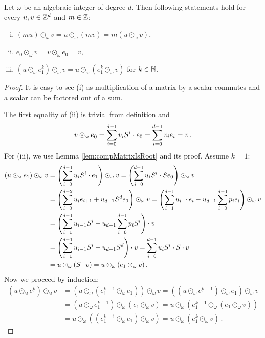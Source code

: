 \begin{lem}
\label{lem:multInZd}
Let $\omega$ be an algebraic integer of degree $d$. Then following statements hold for every $u,v\in \mathbb{Z}^d$ and $m\in\mathbb{Z}$:
\begin{enumerate}[(i)]
    \item $(mu)\odot_\omega v = u \odot_\omega (m v)= m (u\odot_\omega v)$,
    \item $e_0 \odot_\omega v= v \odot_\omega e_0 =v$,
    \item $(u \odot_\omega e_1^k)\odot_\omega v = u \odot_\omega (e_1^k\odot_\omega v)$ for $k\in\mathbb{N}$.
\end{enumerate}
\end{lem}
\begin{proof}
It is easy to see (i) as multiplication of a matrix by a scalar commutes and a scalar can be factored out of a sum. 

The first equality of (ii) is trivial from definition and
$$
v \odot_\omega e_0=\sum_{i=0}^{d-1} {v}_i S^i\cdot e_0= \sum_{i=0}^{d-1} v_i e_i = v\,.
$$
For (iii), we use Lemma \ref{lem:compMatrixIsRoot} and its proof. Assume $k=1$:
\begin{align*}
(u \odot_\omega e_1)\odot_\omega v &= \left(\sum_{i=0}^{d-1} {u}_i S^i \cdot e_1\right) \odot_\omega v = \left(\sum_{i=0}^{d-1} {u}_i S^i \cdot S e_0\right) \odot_\omega v \\
    &=\left(\sum_{i=0}^{d-2}u_i e_{i+1} + u_{d-1} S^d e_{0} \right)\odot_\omega v= \left(\sum_{i=1}^{d-1}u_{i-1} e_{i} - u_{d-1} \sum_{i=0}^{d-1} p_i e_{i} \right)\odot_\omega v \\
    &=\left(\sum_{i=1}^{d-1}u_{i-1}S^i - u_{d-1} \sum_{i=0}^{d-1}p_i S^i \right)\cdot v \\
    &=\left(\sum_{i=1}^{d-1}u_{i-1}S^i  + u_{d-1}S^d\right)\cdot v =\sum_{i=0}^{d-1}u_{i}S^i\cdot S\cdot v \\
    &=u \odot_\omega (S\cdot v)=u \odot_\omega (e_1\odot_\omega v)\,.
\end{align*}
Now we proceed by induction:
\begin{align*}
\left(u \odot_\omega e_1^k\right)\odot_\omega v &=\left(u \odot_\omega (e_1^{k-1}\odot_\omega e_1) \right)\odot_\omega v = \left((u \odot_\omega e_1^{k-1})\odot_\omega e_1 \right)\odot_\omega v \\
    &= (u \odot_\omega e_1^{k-1})\odot_\omega \left(e_1 \odot_\omega v \right)= u \odot_\omega \left( e_1^{k-1}\odot_\omega (e_1 \odot_\omega v )\right)\\
    &= u \odot_\omega \left(( e_1^{k-1}\odot_\omega e_1 )\odot_\omega v \right) = u \odot_\omega \left(e_1^k\odot_\omega v\right)\,.
\end{align*}
\end{proof}




